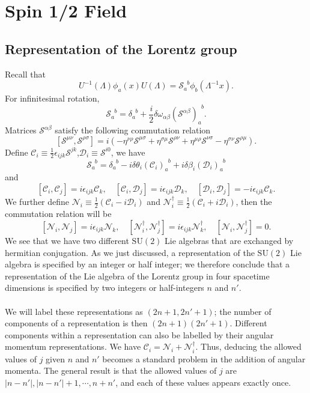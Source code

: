 \chapter{Spin 1/2 Field}
\section{Representation of the Lorentz group}
Recall that
\[U^{-1}(\Lambda) \phi_a(x) U(\Lambda) = \mathscr{S}_{a}^{\phantom{a}b}\phi_b(\Lambda^{-1}x).\]
For infinitesimal rotation,
\[\mathscr{S}_{a}^{\phantom{a}b} = \delta_{a}^{\phantom{a}b}+\frac{i}{2} \delta \omega_{\alpha \beta} (\mathcal{S}^{\alpha \beta})_{a}^{\phantom{a}b} .\]
Matrices $\mathcal{S}^{\alpha \beta}$ satisfy the following commutation relation
\[[\mathcal{S}^{\mu \nu},\mathcal{S}^{\rho \sigma}]= i(-\eta^{\nu \rho}\mathcal{S}^{\mu \sigma} + \eta^{\sigma \mu}\mathcal{S}^{\rho \nu} + \eta^{\mu \rho}\mathcal{S}^{\nu \sigma} - \eta^{\sigma \nu}\mathcal{S}^{\rho \mu}).\]
Define $\mathcal{C}_i \equiv \frac{1}{2}\epsilon_{ijk}\mathcal{S}^{jk}$,$\mathcal{D}_i \equiv \mathcal{S}^{i0}$, we have
\[ \mathscr{S}_{a}^{\phantom{a}b} = \delta_{a}^{\phantom{a}b} -  i \delta \theta_i (\mathcal{C}_i)_{a}^{\phantom{a}b} + i \delta \beta_i (\mathcal{D}_i)_{a}^{\phantom{a}b} \]
and
\[[\mathcal{C}_i,\mathcal{C}_j] = i\epsilon_{ijk}\mathcal{C}_k , \quad [\mathcal{C}_i,\mathcal{D}_j] = i\epsilon_{ijk}\mathcal{D}_k , \quad [\mathcal{D}_i,\mathcal{D}_j] = -i\epsilon_{ijk}\mathcal{C}_k.\]
We further define $\mathcal{N}_i \equiv \frac{1}{2}(\mathcal{C}_i-i\mathcal{D}_i)$ and $\mathcal{N}^{\dagger}_i \equiv \frac{1}{2}(\mathcal{C}_i + i \mathcal{D}_i)$, then the commutation relation will be
\[[\mathcal{N}_i,\mathcal{N}_j] = i\epsilon_{ijk}\mathcal{N}_k , \quad [\mathcal{N}^{\dagger}_i,\mathcal{N}^{\dagger}_j] = i\epsilon_{ijk}\mathcal{N}^{\dagger}_k , \quad [\mathcal{N}_i,\mathcal{N}^{\dagger}_j] = 0.\]
We see that we have two different $\mathrm{SU}(2)$ Lie algebras that are exchanged by hermitian conjugation. As we just discussed, a representation of the $\mathrm{SU}(2)$ Lie algebra is specified by an integer or half integer; we therefore conclude that a representation of the Lie algebra of the Lorentz group in four spacetime dimensions is specified by two integers or half-integers $n$ and $n'$.
\\ \\
We will label these representations as $(2n+1, 2n'+1)$; the number of components of a representation is then $(2n+1)(2n'+1)$. Different components within a representation can also be labelled by their angular momentum representations. We have $\mathcal{C}_i = \mathcal{N}_i + \mathcal{N}^{\dagger}_i$. Thus, deducing the allowed values of $j$ given $n$ and $n'$ becomes a standard problem in the addition of angular momenta. The general result is that the allowed values of $j$ are $|n-n'|,|n-n'|+1,\cdots, n+n'$, and each of these values appears exactly once.

